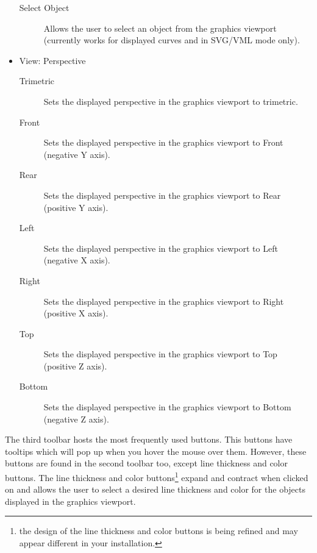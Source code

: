 \documentclass [11pt]{book}
\begin{document}
\begin{itemize}
\begin{description}
\item [Select Object]
Allows the user to select an object from the graphics
                  viewport (currently works for displayed curves and
                  in SVG/VML mode only).

\end{description}



\item View: Perspective

\begin{description}

\item [Trimetric]
Sets the displayed perspective in the graphics viewport to trimetric.

\item [Front]
Sets the displayed perspective in the graphics viewport to Front (negative Y axis).

\item [Rear]
Sets the displayed perspective in the graphics viewport to Rear (positive Y axis).

\item [Left]
Sets the displayed perspective in the graphics viewport to Left (negative X axis).

\item [Right]
Sets the displayed perspective in the graphics viewport to Right (positive X axis).

\item [Top]
Sets the displayed perspective in the graphics viewport to Top (positive Z axis).

\item [Bottom]
Sets the displayed perspective in the graphics viewport to Bottom (negative Z axis).

\end{description}



\end{itemize}



The third toolbar hosts the most frequently used buttons. This
buttons have tooltips which will pop up when you hover the mouse over
them. However, these buttons are found in the second toolbar too,
except line thickness and color buttons. The line thickness and color
buttons\footnote{the design of the line thickness and color buttons is
being refined and may appear different in your installation.} expand and contract when clicked on and allows the user to
select a desired line thickness and color for the objects displayed in
the graphics viewport.
\end{document}
